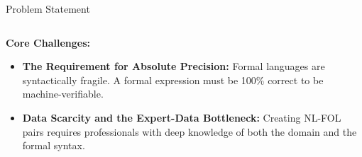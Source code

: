 \documentclass[10pt, aspectratio=169]{beamer}
\begin{document}
\begin{frame}{Problem Statement}
\begin{columns}[c]
    \end{columns}

    \pause
    \vspace{0.6cm}

    \textbf{Core Challenges:}
    \begin{itemize}
        \item \textbf{The Requirement for Absolute Precision:} Formal languages are syntactically fragile. A formal expression must be 100\% correct to be machine-verifiable.
        \item \textbf{Data Scarcity and the Expert-Data Bottleneck:} Creating NL-FOL pairs requires professionals with deep knowledge of both the domain and the formal syntax.
    \end{itemize}

\end{frame}
\end{document}
